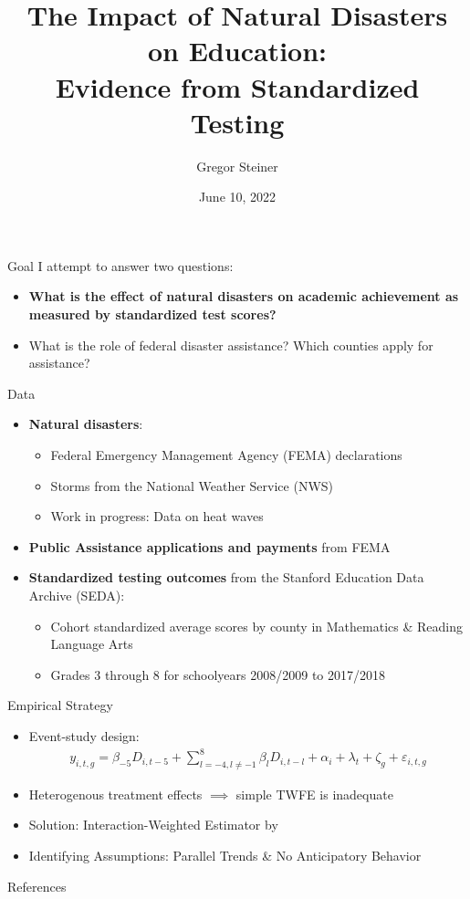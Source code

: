 \documentclass[hyperref={colorlinks = true,linkcolor = blue, citecolor=blue,urlcolor=blue}]{beamer}
\title{The Impact of Natural Disasters on Education: \\ Evidence from Standardized Testing}
\author{Gregor Steiner}
\date{June 10, 2022}
\begin{document}
	
	
	
\begin{frame}[plain]
    \maketitle
\end{frame}

\begin{frame}{Goal}
	I attempt to answer two questions:
	\begin{itemize}
		\item \textbf{What is the effect of natural disasters on academic achievement as measured by standardized test scores?}
		\item What is the role of federal disaster assistance? Which counties apply for assistance?
	\end{itemize}
\end{frame}

\begin{frame}{Data}
	\begin{itemize}
		\item \textbf{Natural disasters}:
		\begin{itemize}
			\item Federal Emergency Management Agency (FEMA) declarations 
			\item Storms from the National Weather Service (NWS)
			\item Work in progress: Data on heat waves
		\end{itemize}
		\item \textbf{Public Assistance applications and payments} from FEMA
		\item \textbf{Standardized testing outcomes} from the Stanford Education Data Archive (SEDA):
		\begin{itemize}
			\item Cohort standardized average scores by county in Mathematics \& Reading Language Arts
			\item Grades 3 through 8 for schoolyears 2008/2009 to 2017/2018
		\end{itemize}
	\end{itemize}
\end{frame}

\begin{frame}{Empirical Strategy}
	\begin{itemize}
		\item Event-study design:
		\begin{align*}
			y_{i, t, g} = \beta_{-5}  D_{i, t-5} + \sum_{l = -4, l \neq -1}^{8} \beta_l D_{i, t-l} + \alpha_i + \lambda_t + \zeta_g + \varepsilon_{i, t, g}
		\end{align*}
		\item Heterogenous treatment effects $\implies$ simple TWFE is inadequate \citep{deChaisemartin_2020}
		\item Solution: Interaction-Weighted Estimator by \cite{Sun_2021}
		\item Identifying Assumptions: Parallel Trends \& No Anticipatory Behavior
	\end{itemize}
\end{frame}


\begin{frame}{References}
	
	
\end{frame}
\end{document}
